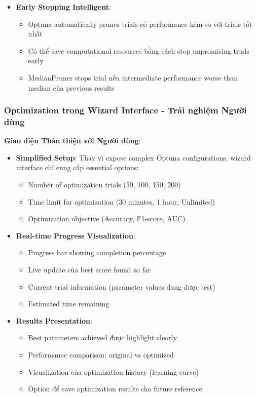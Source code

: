 \begin{itemize}[leftmargin=*]
    \item \textbf{Early Stopping Intelligent}: 
    \begin{itemize}[leftmargin=*]
        \item Optuna automatically prunes trials có performance kém so với trials tốt nhất
        \item Có thể save computational resources bằng cách stop unpromising trials early
        \item MedianPruner stops trial nếu intermediate performance worse than median của previous results
    \end{itemize}
\end{itemize}

\subsubsection{Optimization trong Wizard Interface - Trải nghiệm Người dùng}

\textbf{Giao diện Thân thiện với Người dùng}:
\begin{itemize}[leftmargin=*]
    \item \textbf{Simplified Setup}: Thay vì expose complex Optuna configurations, wizard interface chỉ cung cấp essential options:
    \begin{itemize}[leftmargin=*]
        \item Number of optimization trials (50, 100, 150, 200)
        \item Time limit for optimization (30 minutes, 1 hour, Unlimited)
        \item Optimization objective (Accuracy, F1-score, AUC)
    \end{itemize}
    
    \item \textbf{Real-time Progress Visualization}:
    \begin{itemize}[leftmargin=*]
        \item Progress bar showing completion percentage
        \item Live update của best score found so far
        \item Current trial information (parameter values đang được test)
        \item Estimated time remaining
    \end{itemize}
    
    \item \textbf{Results Presentation}:
    \begin{itemize}[leftmargin=*]
        \item Best parameters achieved được highlight clearly
        \item Performance comparison: original vs optimized
        \item Visualization của optimization history (learning curve)
        \item Option để save optimization results cho future reference
    \end{itemize}
\end{itemize}

